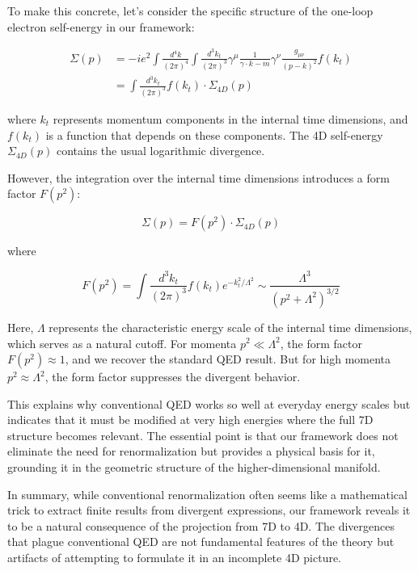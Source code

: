 \documentclass{article}
\begin{document}
To make this concrete, let's consider the specific structure of the one-loop electron self-energy in our framework:

\begin{align}
\Sigma(p) &= -ie^2 \int \frac{d^4k}{(2\pi)^4} \int \frac{d^3k_t}{(2\pi)^3} \gamma^\mu \frac{1}{\gamma \cdot k - m} \gamma^\nu \frac{g_{\mu\nu}}{(p-k)^2} f(k_t) \\
&= \int \frac{d^3k_t}{(2\pi)^3} f(k_t) \cdot \Sigma_{4D}(p)
\end{align}

where $k_t$ represents momentum components in the internal time dimensions, and $f(k_t)$ is a function that depends on these components. The 4D self-energy $\Sigma_{4D}(p)$ contains the usual logarithmic divergence.

However, the integration over the internal time dimensions introduces a form factor $F(p^2)$:

\begin{equation}
\Sigma(p) = F(p^2) \cdot \Sigma_{4D}(p)
\end{equation}

where

\begin{equation}
F(p^2) = \int \frac{d^3k_t}{(2\pi)^3} f(k_t) e^{-k_t^2/\Lambda^2} \sim \frac{\Lambda^3}{(p^2 + \Lambda^2)^{3/2}}
\end{equation}

Here, $\Lambda$ represents the characteristic energy scale of the internal time dimensions, which serves as a natural cutoff. For momenta $p^2 \ll \Lambda^2$, the form factor $F(p^2) \approx 1$, and we recover the standard QED result. But for high momenta $p^2 \approx \Lambda^2$, the form factor suppresses the divergent behavior.

This explains why conventional QED works so well at everyday energy scales but indicates that it must be modified at very high energies where the full 7D structure becomes relevant. The essential point is that our framework does not eliminate the need for renormalization but provides a physical basis for it, grounding it in the geometric structure of the higher-dimensional manifold.

In summary, while conventional renormalization often seems like a mathematical trick to extract finite results from divergent expressions, our framework reveals it to be a natural consequence of the projection from 7D to 4D. The divergences that plague conventional QED are not fundamental features of the theory but artifacts of attempting to formulate it in an incomplete 4D picture.
\end{document}
